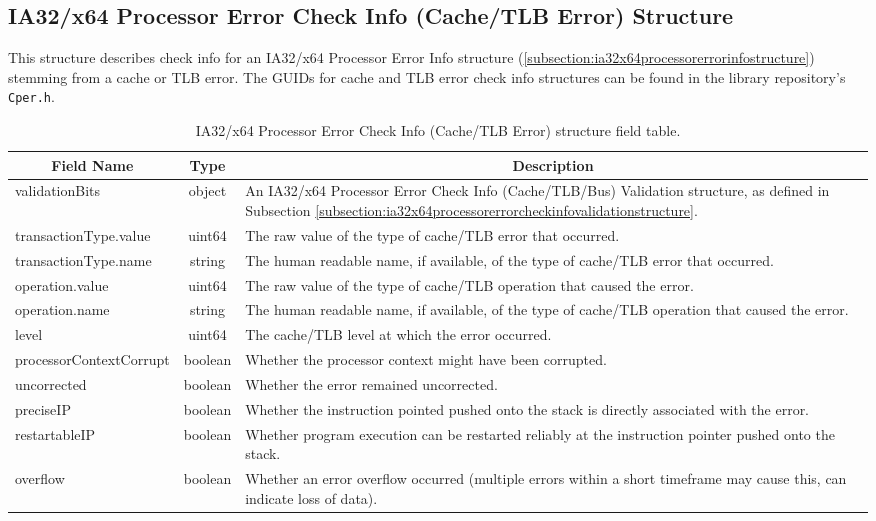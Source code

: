 \documentclass{report}
\newcommand*{\thead}[1]{\multicolumn{1}{|c|}{\bfseries #1}}
\newcommand*{\jsontable}[1]{
    \begin{table}[!ht]
    \label{#1}
    \centering
    \begin{adjustbox}{center}
    \begin{tabular}{|l|c|p{8cm}|}
    \hline
    \thead{Field Name} & \thead{Type} & \thead{Description} \\
    \hline
}
\newcommand*{\jsontableend}[1]{
    \hline
    \end{tabular}
    \end{adjustbox}
    \caption{#1}
    \label{table:#1}
    \end{table}
    \FloatBarrier
}
\begin{document}
\subsection{IA32/x64 Processor Error Check Info (Cache/TLB Error) Structure}
\label{subsection:ia32x64processorerrorcheckinfocachetlbstructure}
This structure describes check info for an IA32/x64 Processor Error Info structure (\ref{subsection:ia32x64processorerrorinfostructure}) stemming from a cache or TLB error.
The GUIDs for cache and TLB error check info structures can be found in the library repository's \texttt{Cper.h}.
\jsontable{table:ia32x64processorerrorcheckinfocachetlbstructure}
validationBits & object & An IA32/x64 Processor Error Check Info (Cache/TLB/Bus) Validation structure, as defined in Subsection \ref{subsection:ia32x64processorerrorcheckinfovalidationstructure}.\\
\hline
transactionType.value & uint64 & The raw value of the type of cache/TLB error that occurred.\\
transactionType.name & string & The human readable name, if available, of the type of cache/TLB error that occurred.\\
\hline
operation.value & uint64 & The raw value of the type of cache/TLB operation that caused the error.\\
operation.name & string & The human readable name, if available, of the type of cache/TLB operation that caused the error.\\
\hline
level & uint64 & The cache/TLB level at which the error occurred.\\
\hline
processorContextCorrupt & boolean & Whether the processor context might have been corrupted.\\
\hline
uncorrected & boolean & Whether the error remained uncorrected.\\
\hline
preciseIP & boolean & Whether the instruction pointed pushed onto the stack is directly associated with the error.\\
\hline
restartableIP & boolean & Whether program execution can be restarted reliably at the instruction pointer pushed onto the stack.\\
\hline
overflow & boolean & Whether an error overflow occurred (multiple errors within a short timeframe may cause this, can indicate loss of data).\\
\jsontableend{IA32/x64 Processor Error Check Info (Cache/TLB Error) structure field table.}

\end{document}
